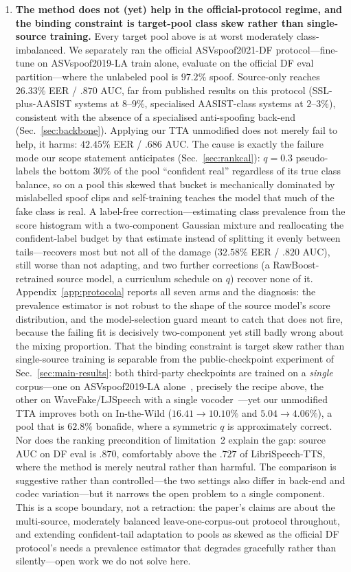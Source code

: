 \documentclass[conference]{IEEEtran}
\begin{document}
\begin{enumerate}
\item \textbf{The method does not (yet) help in the official-protocol regime,
and the binding constraint is target-pool class skew rather than single-source
training.} Every target pool above is at worst moderately class-imbalanced. We
separately ran the official ASVspoof2021-DF protocol---fine-tune on
ASVspoof2019-LA train alone, evaluate on the official DF eval partition---where
the unlabeled pool is $97.2\%$ spoof. Source-only reaches $26.33\%$ EER /
$.870$ AUC, far from published results on this protocol (SSL-plus-AASIST
systems at $8$--$9\%$, specialised AASIST-class systems at $2$--$3\%$),
consistent with the absence of a specialised anti-spoofing back-end
(Sec.~\ref{sec:backbone}). Applying our TTA unmodified does not merely fail to
help, it harms: $42.45\%$ EER / $.686$ AUC. The cause is exactly the failure
mode our scope statement anticipates (Sec.~\ref{sec:rankcal}): $q{=}0.3$
pseudo-labels the bottom $30\%$ of the pool ``confident real'' regardless of
its true class balance, so on a pool this skewed that bucket is mechanically
dominated by mislabelled spoof clips and self-training teaches the model that
much of the fake class is real. A label-free correction---estimating class
prevalence from the score histogram with a two-component Gaussian mixture and
reallocating the confident-label budget by that estimate instead of splitting
it evenly between tails---recovers most but not all of the damage ($32.58\%$
EER / $.820$ AUC), still worse than not adapting, and two further corrections
(a RawBoost-retrained source model, a curriculum schedule on $q$) recover none
of it. Appendix~\ref{app:protocola} reports all seven arms and the diagnosis:
the prevalence estimator is not robust to the shape of the source model's score
distribution, and the model-selection guard meant to catch that does not fire,
because the failing fit is decisively two-component yet still badly wrong about
the mixing proportion. That the binding constraint is target skew rather than
single-source training is separable from the public-checkpoint experiment of
Sec.~\ref{sec:main-results}: both third-party checkpoints are trained on a
\emph{single} corpus---one on ASVspoof2019-LA alone~\cite{deepfensehf},
precisely the recipe above, the other on WaveFake/LJSpeech with a single
vocoder~\cite{shiftyspeech}---yet our unmodified TTA improves both on
In-the-Wild ($16.41\!\to\!10.10\%$ and $5.04\!\to\!4.06\%$), a pool that is
$62.8\%$ bonafide, where a symmetric $q$ is approximately correct. Nor does the
ranking precondition of limitation~2 explain the gap: source AUC on DF eval is
$.870$, comfortably above the $.727$ of LibriSpeech-TTS, where the method is
merely neutral rather than harmful. The comparison is suggestive rather than
controlled---the two settings also differ in back-end and codec variation---but
it narrows the open problem to a single component. This is a scope boundary,
not a retraction: the paper's claims are about the multi-source, moderately
balanced leave-one-corpus-out protocol throughout, and extending confident-tail
adaptation to pools as skewed as the official DF protocol's needs a prevalence
estimator that degrades gracefully rather than silently---open work we do not
solve here.
\end{enumerate}
\end{document}
